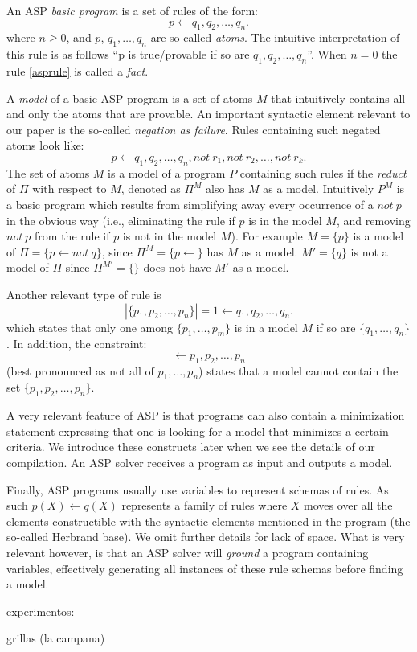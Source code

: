 An ASP \emph{basic program} is a set of rules of the form:
\begin{equation}\label{asprule}
p\leftarrow q_1,q_2,\ldots,q_n.
\end{equation}
where $n\geq 0$, and $p$, $q_1,\ldots,q_n$ are so-called \emph{atoms}. The intuitive interpretation of this rule is as follows ``p is true/provable if so are $q_1,q_2,\ldots,q_n$''. When $n=0$ the rule \eqref{asprule} is called a \emph{fact}.

A \emph{model} of a basic ASP program is a set of atoms $M$ that intuitively contains all and only the atoms that are provable. An important syntactic element relevant to our paper is the so-called \emph{negation as failure}. Rules containing such negated atoms look like:
\begin{equation}\label{asprule}
p\leftarrow q_1,q_2,\ldots,q_n, not\: r_1,not\: r_2, \ldots, not\: r_k .
\end{equation}
The set of atoms $M$ is a model of a program $P$ containing such rules if the \emph{reduct} of $\Pi$ with respect to $M$, denoted as $\Pi^M$ also has $M$ as a model. Intuitively $P^M$ is a basic program which results from simplifying away every occurrence of a $not\:p$ in the obvious way (i.e., eliminating the rule if $p$ is in the model $M$, and removing $not\:p$ from the rule if $p$ is not in the model $M$). For example $M=\{p\}$ is a model of $\Pi=\{p\leftarrow not\: q\}$, since $\Pi^M=\{p\leftarrow \}$ has $M$ as a model. $M'=\{q\}$ is not a model of $\Pi$ since $\Pi^{M'}=\{\}$ does not have $M'$ as a model.

Another relevant type of rule is
\begin{equation}
    |\{p_1,p_2,\ldots,p_n\}|=1 \leftarrow q_1,q_2,\ldots,q_n.
\end{equation}
which states that only one among $\{p_1,\ldots,p_m\}$ is in a model $M$ if so are $\{q_1,\ldots,q_n\}$. In addition, the constraint:
\begin{equation}
    \leftarrow p_1,p_2,\ldots,p_n 
\end{equation}
(best pronounced as not all of $p_1,\ldots,p_n$) states that a model cannot contain the set $\{p_1,p_2,\ldots,p_n\}$.

A very relevant feature of ASP is that programs can also contain a minimization statement expressing that one is looking for a model that minimizes a certain criteria. We introduce these constructs later when we see the details of our compilation. An ASP solver receives a program as input and outputs a model.

Finally, ASP programs usually use variables to represent schemas of rules. As such $p(X)\leftarrow q(X)$ represents a family of rules where $X$ moves over all the elements constructible with the syntactic elements mentioned in the program (the so-called Herbrand base). We omit further details for lack of space. What is very relevant however, is that an ASP solver will \emph{ground} a program containing variables, effectively generating all instances of these rule schemas before finding a model.


experimentos:

grillas (la campana)